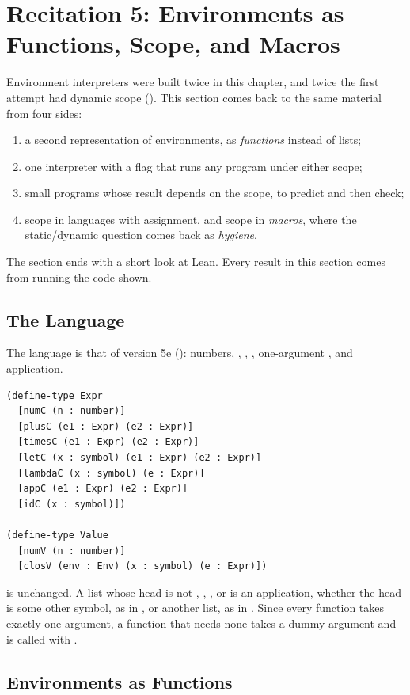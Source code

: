 \section{Recitation 5: Environments as Functions, Scope, and Macros}
\label{sec:rec5}

Environment interpreters were built twice in this chapter, and twice the first attempt had dynamic scope (). This section comes back to the same material from four sides:
\begin{enumerate}
  \item a second representation of environments, as \emph{functions} instead of lists;
  \item one interpreter with a flag  that runs any program under either scope;
  \item small programs whose result depends on the scope, to predict and then check;
  \item scope in languages with assignment, and scope in \emph{macros}, where the static/dynamic question comes back as \emph{hygiene}.
\end{enumerate}
The section ends with a short look at Lean. Every result in this section comes from running the code shown.

\subsection{The Language}

The language is that of version 5e (): numbers, \code{+}, \code{*}, , one-argument , and application.
\begin{lstlisting}
(define-type Expr
  [numC (n : number)]
  [plusC (e1 : Expr) (e2 : Expr)]
  [timesC (e1 : Expr) (e2 : Expr)]
  [letC (x : symbol) (e1 : Expr) (e2 : Expr)]
  [lambdaC (x : symbol) (e : Expr)]
  [appC (e1 : Expr) (e2 : Expr)]
  [idC (x : symbol)])

(define-type Value
  [numV (n : number)]
  [closV (env : Env) (x : symbol) (e : Expr)])
\end{lstlisting}
 is unchanged. A list whose head is not \code{+}, \code{*}, , or  is an application, whether the head is some other symbol, as in , or another list, as in . Since every function takes exactly one argument, a function that needs none takes a dummy argument \code{\_} and is called with .

\subsection{Environments as Functions}

